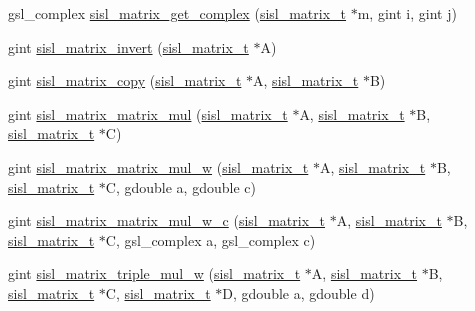 \begin{DoxyCompactItemize}
gsl\+\_\+complex \mbox{\hyperlink{group__matrix_ga0a0ea595d8beec73a6673101ad348add}{sisl\+\_\+matrix\+\_\+get\+\_\+complex}} (\mbox{\hyperlink{group__matrix_gad147923587b355644defb9bfbf981740}{sisl\+\_\+matrix\+\_\+t}} $\ast$m, gint i, gint j)
\item 
gint \mbox{\hyperlink{group__matrix_ga9ebe378f73157b236e04d65d0d982864}{sisl\+\_\+matrix\+\_\+invert}} (\mbox{\hyperlink{group__matrix_gad147923587b355644defb9bfbf981740}{sisl\+\_\+matrix\+\_\+t}} $\ast$A)
\item 
gint \mbox{\hyperlink{group__matrix_ga76214ff23ddf1c1175d918868ba29b97}{sisl\+\_\+matrix\+\_\+copy}} (\mbox{\hyperlink{group__matrix_gad147923587b355644defb9bfbf981740}{sisl\+\_\+matrix\+\_\+t}} $\ast$A, \mbox{\hyperlink{group__matrix_gad147923587b355644defb9bfbf981740}{sisl\+\_\+matrix\+\_\+t}} $\ast$B)
\item 
gint \mbox{\hyperlink{group__matrix_ga4eba2be7655e4f1b1845709f27994445}{sisl\+\_\+matrix\+\_\+matrix\+\_\+mul}} (\mbox{\hyperlink{group__matrix_gad147923587b355644defb9bfbf981740}{sisl\+\_\+matrix\+\_\+t}} $\ast$A, \mbox{\hyperlink{group__matrix_gad147923587b355644defb9bfbf981740}{sisl\+\_\+matrix\+\_\+t}} $\ast$B, \mbox{\hyperlink{group__matrix_gad147923587b355644defb9bfbf981740}{sisl\+\_\+matrix\+\_\+t}} $\ast$C)
\item 
gint \mbox{\hyperlink{group__matrix_ga1b38f4144079da23373564e920652425}{sisl\+\_\+matrix\+\_\+matrix\+\_\+mul\+\_\+w}} (\mbox{\hyperlink{group__matrix_gad147923587b355644defb9bfbf981740}{sisl\+\_\+matrix\+\_\+t}} $\ast$A, \mbox{\hyperlink{group__matrix_gad147923587b355644defb9bfbf981740}{sisl\+\_\+matrix\+\_\+t}} $\ast$B, \mbox{\hyperlink{group__matrix_gad147923587b355644defb9bfbf981740}{sisl\+\_\+matrix\+\_\+t}} $\ast$C, gdouble a, gdouble c)
\item 
gint \mbox{\hyperlink{group__matrix_ga3385021e65f7e2efab1f6c61cedf0fa3}{sisl\+\_\+matrix\+\_\+matrix\+\_\+mul\+\_\+w\+\_\+c}} (\mbox{\hyperlink{group__matrix_gad147923587b355644defb9bfbf981740}{sisl\+\_\+matrix\+\_\+t}} $\ast$A, \mbox{\hyperlink{group__matrix_gad147923587b355644defb9bfbf981740}{sisl\+\_\+matrix\+\_\+t}} $\ast$B, \mbox{\hyperlink{group__matrix_gad147923587b355644defb9bfbf981740}{sisl\+\_\+matrix\+\_\+t}} $\ast$C, gsl\+\_\+complex a, gsl\+\_\+complex c)
\item 
gint \mbox{\hyperlink{group__matrix_gaf23a4fdd6ccbcc355f2e48ccf12deed4}{sisl\+\_\+matrix\+\_\+triple\+\_\+mul\+\_\+w}} (\mbox{\hyperlink{group__matrix_gad147923587b355644defb9bfbf981740}{sisl\+\_\+matrix\+\_\+t}} $\ast$A, \mbox{\hyperlink{group__matrix_gad147923587b355644defb9bfbf981740}{sisl\+\_\+matrix\+\_\+t}} $\ast$B, \mbox{\hyperlink{group__matrix_gad147923587b355644defb9bfbf981740}{sisl\+\_\+matrix\+\_\+t}} $\ast$C, \mbox{\hyperlink{group__matrix_gad147923587b355644defb9bfbf981740}{sisl\+\_\+matrix\+\_\+t}} $\ast$D, gdouble a, gdouble d)

\end{DoxyCompactItemize}
